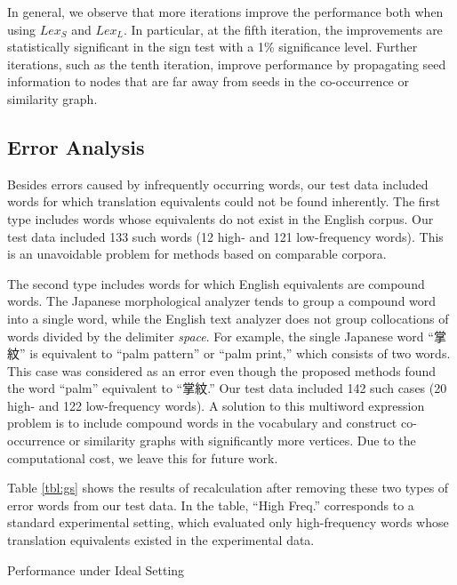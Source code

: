 \documentclass[english]{jnlp_1.4}
\begin{document}
In general, we observe that more iterations improve the performance both when using $\mathit{Lex}_{S}$ and $\mathit{Lex}_{L}$. 
In particular, at the fifth iteration, the improvements are statistically significant in the sign test with a 1\% significance level. 
Further iterations, such as the tenth iteration, improve performance by propagating seed information to nodes that are far away from seeds in the co-occurrence or similarity graph. 


\subsection{Error Analysis}

Besides errors caused by infrequently occurring words, our test data included words for which translation equivalents could not be found inherently. 
The first type includes words whose equivalents do not exist in the English corpus. 
Our test data included 133 such words (12 high- and 121 low-frequency words). 
This is an unavoidable problem for methods based on comparable corpora. 

The second type includes words for which English equivalents are compound words. 
The Japanese morphological analyzer tends to group a compound word into a single word, while the English text analyzer does not group collocations of words divided by the delimiter \textit{space}. 
For example, the single Japanese word ``掌紋'' is equivalent to ``palm pattern'' or ``palm print,'' which consists of two words. 
This case was considered as an error even though the proposed methods found the word ``palm'' equivalent to ``掌紋.'' 
Our test data included 142 such cases (20 high- and 122 low-frequency words). 
A solution to this multiword expression problem is to include compound words in the vocabulary and construct co-occurrence or similarity graphs with significantly more vertices. 
Due to the computational cost, we leave this for future work. 

Table \ref{tbl:gs} shows the results of recalculation after removing these two types of error words from our test data. 
In the table, ``High Freq.'' corresponds to a standard experimental setting, which evaluated only high-frequency words whose translation equivalents existed in the experimental data. 

\begin{table}[t]
\caption{Performance under Ideal Setting}
\label{tbl:gs}

\end{table}
\end{document}

